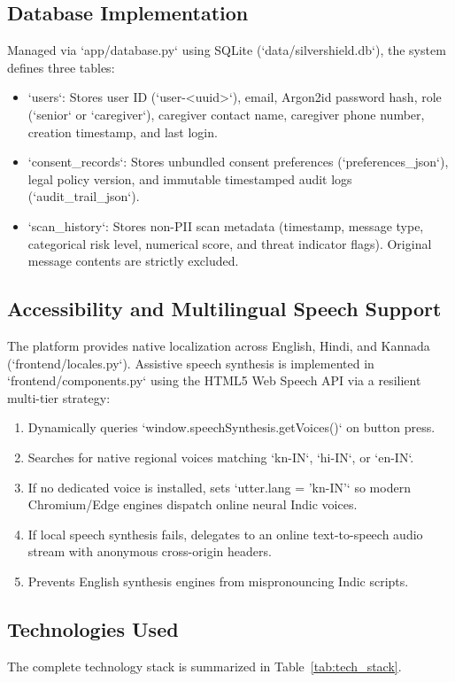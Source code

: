 \documentclass[conference]{IEEEtran}
\begin{document}
\subsection{Database Implementation}
Managed via `app/database.py` using SQLite (`data/silvershield.db`), the system defines three tables:
\begin{itemize}
    \item `users`: Stores user ID (`user-<uuid>`), email, Argon2id password hash, role (`senior` or `caregiver`), caregiver contact name, caregiver phone number, creation timestamp, and last login.
    \item `consent_records`: Stores unbundled consent preferences (`preferences_json`), legal policy version, and immutable timestamped audit logs (`audit_trail_json`).
    \item `scan_history`: Stores non-PII scan metadata (timestamp, message type, categorical risk level, numerical score, and threat indicator flags). Original message contents are strictly excluded.
\end{itemize}

\subsection{Accessibility and Multilingual Speech Support}
The platform provides native localization across English, Hindi, and Kannada (`frontend/locales.py`). Assistive speech synthesis is implemented in `frontend/components.py` using the HTML5 Web Speech API via a resilient multi-tier strategy:
\begin{enumerate}
    \item Dynamically queries `window.speechSynthesis.getVoices()` on button press.
    \item Searches for native regional voices matching `kn-IN`, `hi-IN`, or `en-IN`.
    \item If no dedicated voice is installed, sets `utter.lang = 'kn-IN'` so modern Chromium/Edge engines dispatch online neural Indic voices.
    \item If local speech synthesis fails, delegates to an online text-to-speech audio stream with anonymous cross-origin headers.
    \item Prevents English synthesis engines from mispronouncing Indic scripts.
\end{enumerate}

\subsection{Technologies Used}
The complete technology stack is summarized in Table~\ref{tab:tech_stack}.
\end{document}
